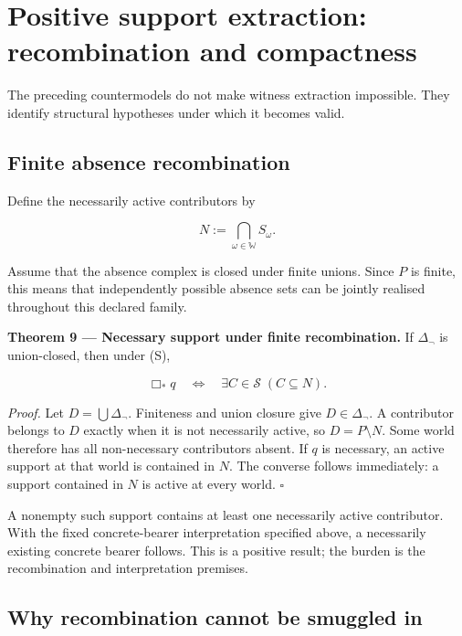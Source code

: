 \documentclass[11pt,a4paper]{article}
\begin{document}
\section{Positive support extraction: recombination and
compactness}\label{positive-support-extraction-recombination-and-compactness}

The preceding countermodels do not make witness extraction impossible.
They identify structural hypotheses under which it becomes valid.

\subsection{Finite absence
recombination}\label{finite-absence-recombination}

Define the necessarily active contributors by

\nopagebreak[4]

\[
N:=\bigcap_{\omega\in\mathbb W}S_\omega.
\]

Assume that the absence complex is closed under finite unions. Since
\(P\) is finite, this means that independently possible absence sets can
be jointly realised throughout this declared family.


\textbf{Theorem 9 --- Necessary support under finite recombination.} If
\(\Delta_{\neg}\) is union-closed, then under (S),

\nopagebreak[4]

\[
\boxed{
\Box_*q
\quad\Longleftrightarrow\quad
\exists C\in\mathscr S\;(C\subseteq N).
}
\]

\emph{Proof.} Let \(D=\bigcup\Delta_{\neg}\). Finiteness and union
closure give \(D\in\Delta_{\neg}\). A contributor belongs to \(D\)
exactly when it is not necessarily active, so \(D=P\setminus N\). Some
world therefore has all non-necessary contributors absent. If \(q\) is
necessary, an active support at that world is contained in \(N\). The
converse follows immediately: a support contained in \(N\) is active at
every world. \(\square\)

A nonempty such support contains at least one necessarily active
contributor. With the fixed concrete-bearer interpretation specified
above, a necessarily existing concrete bearer follows. This is a
positive result; the burden is the recombination and interpretation
premises.

\subsection{Why recombination cannot be smuggled
in}\label{why-recombination-cannot-be-smuggled-in}
\end{document}

